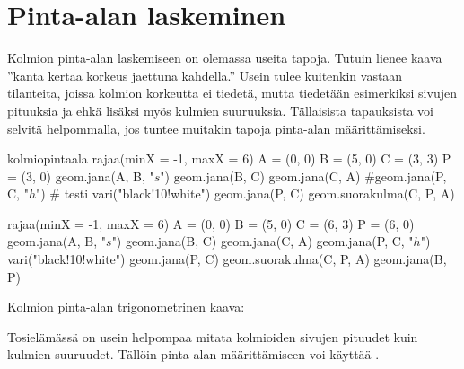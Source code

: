 \section*{Pinta-alan laskeminen}

Kolmion pinta-alan laskemiseen on olemassa useita tapoja. Tutuin lienee kaava ''kanta kertaa korkeus jaettuna kahdella.'' Usein tulee kuitenkin vastaan tilanteita, joissa kolmion korkeutta ei tiedetä, mutta tiedetään esimerkiksi sivujen pituuksia ja ehkä lisäksi myös kulmien suuruuksia. Tällaisista tapauksista voi selvitä helpommalla, jos tuntee muitakin tapoja pinta-alan määrittämiseksi.

\begin{luoKuva}{kolmiopintaala}
	rajaa(minX = -1, maxX = 6)
	A = (0, 0)
	B = (5, 0)
	C = (3, 3)
	P = (3, 0)
	geom.jana(A, B, "$s$")
	geom.jana(B, C)
	geom.jana(C, A)
	#geom.jana(P, C, "$h$") # testi
	vari("black!10!white")
	geom.jana(P, C) 
	geom.suorakulma(C, P, A)
\end{luoKuva}


\begin{center}
\begin{kuva}
	rajaa(minX = -1, maxX = 6)
	A = (0, 0)
	B = (5, 0)
	C = (6, 3)
	P = (6, 0)
	geom.jana(A, B, "$s$")
	geom.jana(B, C)
	geom.jana(C, A)
	geom.jana(P, C, "$h$")
	vari("black!10!white")
	geom.jana(P, C)
	geom.suorakulma(C, P, A)
	geom.jana(B, P)
\end{kuva}
\end{center}



Kolmion pinta-alan trigonometrinen kaava:


Tosielämässä on usein helpompaa mitata kolmioiden sivujen pituudet kuin kulmien suuruudet. Tällöin pinta-alan määrittämiseen voi käyttää .

